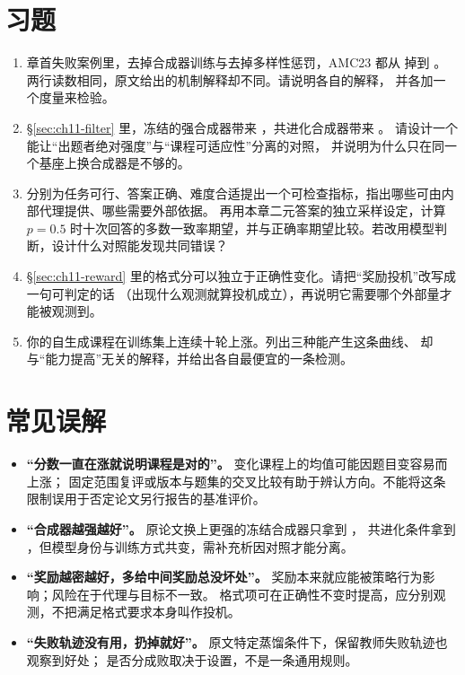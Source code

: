\section*{习题}
\begin{enumerate}[label=11-\arabic*.,ref=11-\arabic*]
\sloppy
  \item\label{ex:ch11-1} 章首失败案例里，去掉合成器训练与去掉多样性惩罚，AMC23 都从  掉到 。
        两行读数相同，原文给出的机制解释却不同。请说明各自的解释，
        并各加一个度量来检验。
  \item\label{ex:ch11-2} \S\ref{sec:ch11-filter} 里，冻结的强合成器带来 ，共进化合成器带来 。
        请设计一个能让“出题者绝对强度”与“课程可适应性”分离的对照，
        并说明为什么只在同一个基座上换合成器是不够的。
  \item\label{ex:ch11-3} 分别为任务可行、答案正确、难度合适提出一个可检查指标，指出哪些可由内部代理提供、哪些需要外部依据。
        再用本章二元答案的独立采样设定，计算 $p=0.5$ 时十次回答的多数一致率期望，并与正确率期望比较。若改用模型判断，设计什么对照能发现共同错误？
  \item\label{ex:ch11-4} \S\ref{sec:ch11-reward} 里的格式分可以独立于正确性变化。请把“奖励投机”改写成一句可判定的话
        （出现什么观测就算投机成立），再说明它需要哪个外部量才能被观测到。
  \item\label{ex:ch11-5} 你的自生成课程在训练集上连续十轮上涨。列出三种能产生这条曲线、
        却与“能力提高”无关的解释，并给出各自最便宜的一条检测。
\end{enumerate}

\section*{常见误解}
\begin{itemize}
\sloppy
  \item \textbf{“分数一直在涨就说明课程是对的”。}
        变化课程上的均值可能因题目变容易而上涨；
        固定范围复评或版本与题集的交叉比较有助于辨认方向。不能将这条限制误用于否定论文另行报告的基准评价。
  \item \textbf{“合成器越强越好”。}
        原论文换上更强的冻结合成器只拿到 ，
        共进化条件拿到 ，但模型身份与训练方式共变，需补充析因对照才能分离。
  \item \textbf{“奖励越密越好，多给中间奖励总没坏处”。}
        奖励本来就应能被策略行为影响；风险在于代理与目标不一致。
        格式项可在正确性不变时提高，应分别观测，不把满足格式要求本身叫作投机。
  \item \textbf{“失败轨迹没有用，扔掉就好”。}
        原文特定蒸馏条件下，保留教师失败轨迹也观察到好处；
        是否分成败取决于设置，不是一条通用规则。
\end{itemize}

